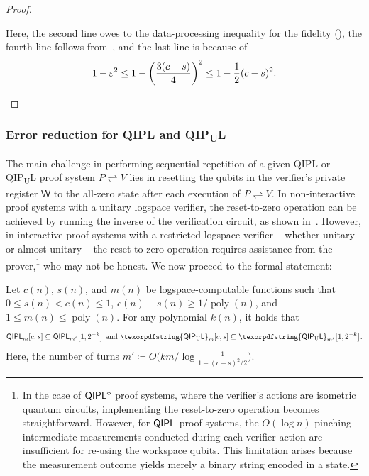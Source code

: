 \documentclass[10pt,a4paper]{article}
\numberwithin{equation}{section}
\numberwithin{figure}{section}
\newcommand{\QIPL}{\textnormal{\textsf{QIPL}}\xspace}
\newcommand{\QIPUL}{\texorpdfstring{\textnormal{\textsf{QIP}\textsubscript{\textnormal{U}}\textsf{L}}}\xspace}
\newcommand{\protocol}[2]{{#1}\!\rightleftharpoons\!{#2}}
\DeclarePairedDelimiter\rbra{\lparen}{\rparen}
\DeclareMathOperator\poly{poly}
\newcommand{\sfW}{\mathsf{W}}
\begin{document}
\begin{proof}
\begin{itemize}[leftmargin=2em]
        Here, the second line owes to the data-processing inequality for the fidelity (), the fourth line follows from~\cite[Equation (4.25)]{VW16}, and the last line is because of 
        \[1-\varepsilon^2 \leq 1 - \rbra*{\frac{3(c-s)}{4}}^2 \leq 1 - \frac{1}{2}(c-s)^2. \qedhere\]
    \end{itemize}

\end{proof}

\subsubsection{Error reduction for \QIPL{} and \QIPUL{}}

The main challenge in performing sequential repetition of a given \QIPL{} or \QIPUL{} proof system $\protocol{P}{V}$ lies in resetting the qubits in the verifier's private register $\sfW$ to the all-zero state after each execution of $\protocol{P}{V}$. 
In non-interactive proof systems with a unitary logspace verifier, the reset-to-zero operation can be achieved by running the inverse of the verification circuit, as shown in~\cite{MW05,FKLMN16}. However, in interactive proof systems with a restricted logspace verifier -- whether unitary or almost-unitary -- the reset-to-zero operation requires assistance from the prover,\footnote{In the case of $\QIPL{}^\diamond$ proof systems, where the verifier's actions are isometric quantum circuits, implementing the reset-to-zero operation becomes straightforward. However, for $\QIPL{}$ proof systems, the $O(\log{n})$ pinching intermediate measurements conducted during each verifier action are insufficient for re-using the workspace qubits. This limitation arises because the measurement outcome yields merely a binary string encoded in a state.} who may not be honest.
We now proceed to the formal statement:

\begin{lemma}[Error reduction for \QIPL{} and \QIPUL{}]
    \label{lemma:QIPL-error-reduction}
    Let $c(n)$, $s(n)$, and $m(n)$ be logspace-computable functions such that $0 \leq s(n) < c(n) \leq 1$, $c(n) - s(n) \geq 1/\poly(n)$, and $1 \leq m(n) \leq \poly(n)$. For any polynomial $k(n)$, it holds that
    \[ \QIPL_m[c,s] \subseteq \QIPL_{m'}\big[1, 2^{-k}\big] \text{ and } \QIPUL_m[c,s] \subseteq \QIPUL_{m'}\big[1, 2^{-k}\big]. \]
    Here, the number of turns $m' \coloneqq O\big(km/\log\frac{1}{1-(c-s)^2/2}\big)$.
\end{lemma}
\end{document}
